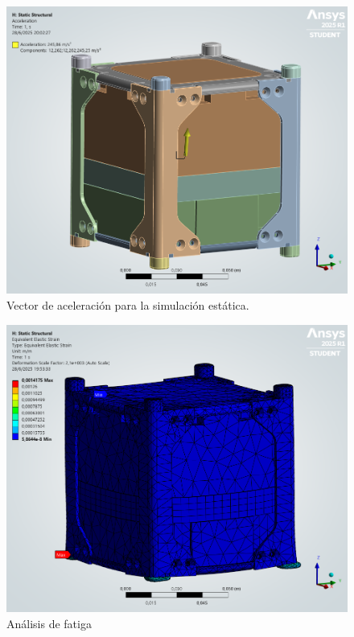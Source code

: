   \begin{figure}[H]
    \centering
    \includegraphics[width=14cm]{image/fem/ansys_cubesat-static_acceleration.png}
    \caption{Vector de aceleración para la simulación estática.}
    \label{fig:fem_static_acc}
  \end{figure}

  \begin{figure}[H]
    \centering
    \includegraphics[width=14cm]{image/fem/ansys_cubesat-static_strain.png}
    \caption{Análisis de fatiga}
    \label{fig:fem_static_strain}
  \end{figure}

